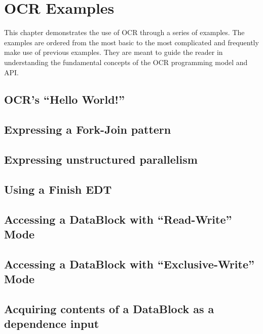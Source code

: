 

\chapter{OCR  Examples}
\label{chap:OCR Examples}
\label{chap:Appendix A}


This chapter demonstrates the use of OCR through a series of
examples. The examples are ordered from the most basic to the most
complicated and frequently make use of previous examples. They are
meant to guide the reader in understanding the fundamental concepts of
the OCR programming model and API.

\section{OCR's ``Hello World!''}

\section{Expressing a Fork-Join pattern}

\section{Expressing unstructured parallelism}

\section{Using a Finish EDT}

\section{Accessing a DataBlock with ``Read-Write'' Mode}

\section{Accessing a DataBlock with ``Exclusive-Write'' Mode}

\section{Acquiring contents of a DataBlock as a dependence input}

